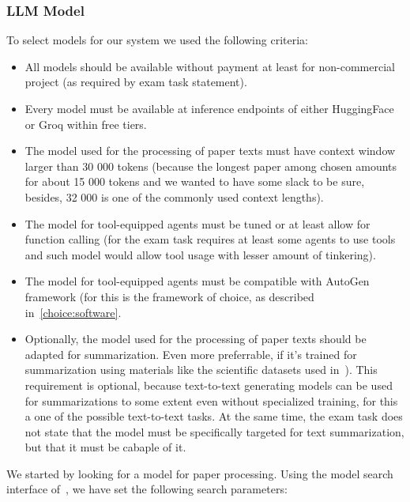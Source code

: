 \subsubsection{LLM Model}
\label{choice:model}

To select models for our system we used the following criteria:

\begin{itemize}
	\item All models should be available without payment at least for non-commercial project  (as required by exam task statement).
	\item Every model must be available at inference endpoints of either HuggingFace or Groq within free tiers.
	\item The model used for the processing of paper texts must have context window larger than 30 000 tokens (because the longest paper among chosen amounts for about 15 000 tokens and we wanted to have some slack to be sure, besides, 32 000 is one of the commonly used context lengths).
	\item The model for tool-equipped agents must be tuned or at least allow for function calling (for the exam task requires at least some agents to use tools and such model would allow tool usage with lesser amount of tinkering).
	\item The model for tool-equipped agents must be compatible with AutoGen framework (for this is the framework of choice, as described in~\ref{choice:software}.
	\item Optionally, the model used for the processing of paper texts should be adapted for summarization. Even more preferrable, if it's trained for summarization using materials like the scientific datasets used in~\cite{Cohan_2018}). This requirement is optional, because text-to-text generating models can be used for summarizations to some extent even without specialized training, for this a one of the possible text-to-text tasks. At the same time, the exam task does not state that the model must be specifically targeted for text summarization, but that it must be cabaple of it.
\end{itemize}

We started by looking for a model for paper processing. Using the model search interface of~\cite{huggingface}, we have set the following search parameters: 

